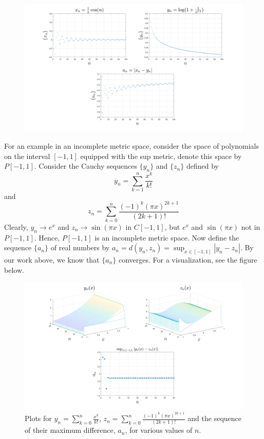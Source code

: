 \documentclass{article}
\begin{document}
\begin{itemize}
    \begin{figure}[H]
        \includegraphics[scale = 0.3]{cauchySeqs.png}
        \centering
    \end{figure}
    For an example in an incomplete metric space, consider the space of polynomials on the interval $[-1,1]$ equipped with the sup metric, denote this space by $P[-1,1]$. Consider the Cauchy sequences $\{y_n\}$ and $\{z_n\}$ defined by
    \[y_n = \sum_{k=1}^n \frac{x^k}{k!}\]
    and
    \[z_n = \sum_{k=0}^n \frac{(-1)^k(\pi x)^{2k + 1}}{(2k + 1)!}\]
    Clearly, $y_n \to e^x$ and $z_n \to \sin(\pi x)$ in $C[-1,1]$, but $e^x$ and $\sin(\pi x)$  not in $P[-1,1]$. Hence, $P[-1,1]$ is an incomplete metric space. Now define the sequence $\{a_n\}$ of real numbers by $a_n = d(y_n,z_n) = \sup_{x \in [-1,1]} |y_n - z_n|$. By our work above, we know that $\{a_n\}$ converges. For a visualization, see the figure below.

    \begin{figure}[H]
        \includegraphics[scale = 0.3]{supExamp.png}
        \centering
        \caption{Plots for $y_n = \sum_{k=0}^n \tfrac{x^k}{k!}$, $z_n = \sum_{k=0}^n \tfrac{(-1)^k(\pi x)^{2k+1}}{(2k+1)!}$ and the sequence of their maximum difference, $a_n$, for various values of $n$.}
    \end{figure}
\end{itemize}
\end{document}
